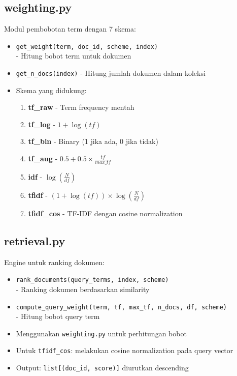 \documentclass[12pt,a4paper]{report}
\begin{document}
\subsection{weighting.py}
Modul pembobotan term dengan 7 skema:
\begin{itemize}
    \item \texttt{get\_weight(term, doc\_id, scheme, index)}\\ - Hitung bobot term untuk dokumen
    \item \texttt{get\_n\_docs(index)} - Hitung jumlah dokumen dalam koleksi
    \item Skema yang didukung:
    \begin{enumerate}
        \item \textbf{tf\_raw} - Term frequency mentah
        \item \textbf{tf\_log} - $1 + \log(tf)$
        \item \textbf{tf\_bin} - Binary (1 jika ada, 0 jika tidak)
        \item \textbf{tf\_aug} - $0.5 + 0.5 \times \frac{tf}{max\_tf}$
        \item \textbf{idf} - $\log(\frac{N}{df})$
        \item \textbf{tfidf} - $(1 + \log(tf)) \times \log(\frac{N}{df})$
        \item \textbf{tfidf\_cos} - TF-IDF dengan cosine normalization
    \end{enumerate}
\end{itemize}

\subsection{retrieval.py}
Engine untuk ranking dokumen:
\begin{itemize}
    \item \texttt{rank\_documents(query\_terms, index, scheme)}\\ - Ranking dokumen berdasarkan similarity
    \item \texttt{compute\_query\_weight(term, tf, max\_tf, n\_docs, df, scheme)}\\ - Hitung bobot query term
    \item Menggunakan \texttt{weighting.py} untuk perhitungan bobot
    \item Untuk \texttt{tfidf\_cos}: melakukan cosine normalization pada query vector
    \item Output: \texttt{list[(doc\_id, score)]} diurutkan descending
\end{itemize}
\end{document}
